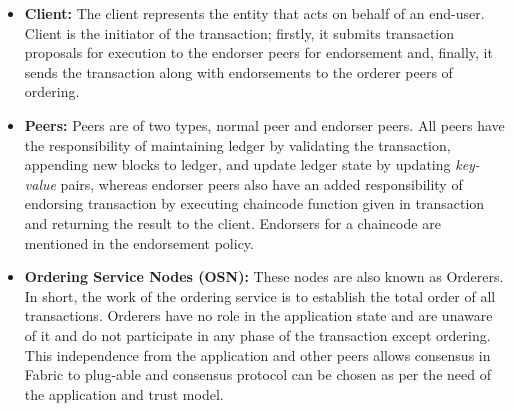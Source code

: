 \begin{itemize}
    \item \textbf{Client:} The client represents the entity that acts on behalf of an end-user. Client is the initiator of the transaction; firstly, it submits transaction proposals for execution to the endorser peers for endorsement and, finally, it sends the transaction along with endorsements to the orderer peers of ordering.  
    \item \textbf{Peers:} Peers are of two types, normal peer and endorser peers.
    All peers have the responsibility of maintaining ledger by validating the transaction, appending new blocks to ledger, and update ledger state by updating \textit{key-value} pairs, whereas endorser peers also have an added responsibility of endorsing transaction by executing chaincode function given in transaction and returning the result to the client. Endorsers for a chaincode are mentioned in the endorsement policy.
    
    \item \textbf{Ordering Service Nodes (OSN):} These nodes are also known as Orderers. In short, the work of the ordering service is to establish the total order of all transactions. Orderers have no role in the application state and are unaware of it and do not participate in any phase of the transaction except ordering. This independence from the application and other peers allows consensus in Fabric to plug-able and consensus protocol can be chosen as per the need of the application and  trust model. 
\end{itemize}

